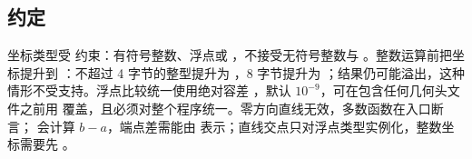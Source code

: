 \subsection{约定}

坐标类型受  约束：有符号整数、浮点或 ，不接受无符号整数与 。整数运算前把坐标提升到 ：不超过 4 字节的整型提升为 ，8 字节提升为 ；结果仍可能溢出，这种情形不受支持。浮点比较统一使用绝对容差 ，默认 $10^{-9}$，可在包含任何几何头文件之前用  覆盖，且必须对整个程序统一。零方向直线无效，多数函数在入口断言； 会计算 $b-a$，端点差需能由  表示；直线交点只对浮点类型实例化，整数坐标需要先 。

